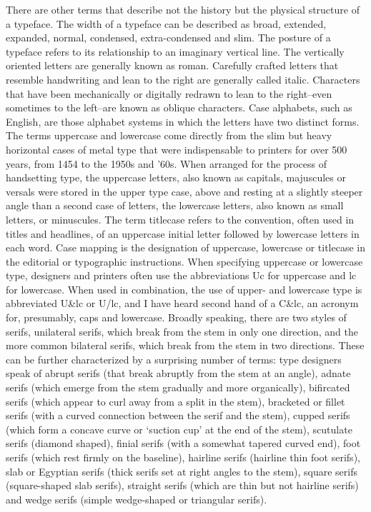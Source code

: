 \documentclass[12pt,a4paper,twocolumn]{book} %
\begin{document}
There are other terms that describe not the history but the physical structure of a typeface. The width of a typeface can be described as broad, extended, expanded, normal, condensed, extra-condensed and slim. The posture of a typeface refers to its relationship to an imaginary vertical line. The vertically oriented letters are generally known as roman. Carefully crafted letters that resemble handwriting and lean to the right are generally called italic. Characters that have been mechanically or digitally redrawn to lean to the right–even sometimes to the left–are known as oblique characters.
Case alphabets, such as English, are those alphabet systems in which the letters have two distinct forms. The terms uppercase and lowercase come directly from the slim but heavy horizontal cases of metal type that were indispensable to printers for over 500 years, from 1454 to the 1950s and ’60s. When arranged for the process of handsetting type, the uppercase letters, also known as capitals, majuscules or versals were stored in the upper type case, above and resting at a slightly steeper angle than a second case of letters, the lowercase letters, also known as small letters, or minuscules. The term titlecase refers to the convention, often used in titles and headlines, of an uppercase initial letter followed by lowercase letters in each word.
Case mapping is the designation of uppercase, lowercase or titlecase in the editorial or typographic instructions. When specifying uppercase or lowercase type, designers and printers often use the abbreviations Uc for uppercase and lc for lowercase. When used in combination, the use of upper- and lowercase type is abbreviated U&lc or U/lc, and I have heard second hand of a C&lc, an acronym for, presumably, caps and lowercase.
Broadly speaking, there are two styles of serifs, unilateral serifs, which break from the stem in only one direction, and the more common bilateral serifs, which break from the stem in two directions. These can be further characterized by a surprising number of terms: type designers speak of abrupt serifs (that break abruptly from the stem at an angle), adnate serifs (which emerge from the stem gradually and more organically), bifircated serifs (which appear to curl away from a split in the stem), bracketed or fillet serifs (with a curved connection between the serif and the stem), cupped serifs (which form a concave curve or ‘suction cup’ at the end of the stem), scutulate serifs (diamond shaped), finial serifs (with a somewhat tapered curved end), foot serifs (which rest firmly on the baseline), hairline serifs (hairline thin foot serifs), slab or Egyptian serifs (thick serifs set at right angles to the stem), square serifs (square-shaped slab serifs), straight serifs (which are thin but not hairline serifs) and wedge serifs (simple wedge-shaped or triangular serifs).
\end{document}
